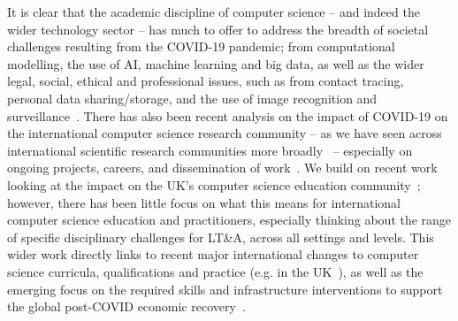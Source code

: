 \documentclass[conference]{IEEEtran}
\begin{document}



It is clear that the academic discipline of computer science -- and
indeed the wider technology sector -- has much to offer to address the
breadth of societal challenges resulting from the COVID-19 pandemic;
from computational modelling, the use of AI, machine learning and big
data, as well as the wider legal, social, ethical and professional
issues, such as from contact tracing, personal data sharing/storage,
and the use of image recognition and
surveillance~\cite{dwivedi-et-al:ijim2019,ting-et-al:2020,cerf:2020,chun-et-al:2020,rcjbbcnews:2020}. There
has also been recent analysis on the impact of COVID-19 on the
international computer science research community -- as we have seen
across international scientific research communities more
broadly~\cite{oecdcovid19:2020} -- especially on ongoing projects,
careers, and dissemination of work~\cite{msrcovid19:2020}. We build on
recent work looking at the impact on the UK's computer science
education community~\cite{crick-et-al:ukicer2020}; however, there has
been little focus on what this means for international computer
science education and practitioners, especially thinking about the
range of specific disciplinary challenges for LT\&A, across all
settings and levels. This wider work directly links to recent major
international changes to computer science curricula, qualifications
and practice (e.g. in the
UK~\cite{brown-et-al-sigcse2013,brown-et-al-toce2014}), as well as the
emerging focus on the required skills and infrastructure interventions
to support the global post-COVID economic
recovery~\cite{davenport-et-al:educon2020,euparl:2020,mckinsey:2020}.


\end{document}
